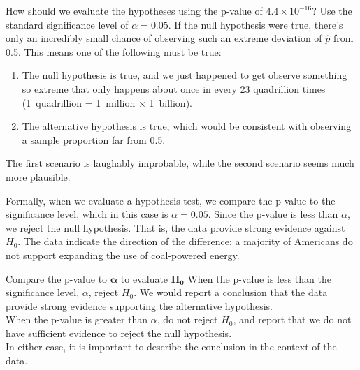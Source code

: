 \begin{examplewrap}
\begin{nexample}{How should we evaluate the hypotheses using the
    p-value of $4.4 \times 10^{-16}$?
    Use the standard significance level of $\alpha = 0.05$.}
  If the null hypothesis were true, there's only an incredibly
  small chance of observing such an extreme deviation of
  $\hat{p}$ from 0.5.
  This means one of the following must be true:
  \begin{enumerate}
    \item The null hypothesis is true, and we just happened
        to get observe something so extreme that only happens
        about once in every 23 quadrillion times
        (1~quadrillion = 1~million $\times$ 1~billion).
    \item The alternative hypothesis is true,
        which would be consistent
        with observing a sample proportion far from 0.5.
  \end{enumerate}
  The first scenario is laughably improbable,
  while the second scenario seems much more plausible.

  Formally, when we evaluate a hypothesis test,
  we compare the p-value to the significance level,
  which in this case is $\alpha = 0.05$.
  Since the p-value is less than $\alpha$,
  we reject the null hypothesis.
  That is, the data provide strong evidence against $H_0$.
  The data indicate the direction of the difference:
  a majority of Americans do not support
  expanding the use of coal-powered energy.
\end{nexample}
\end{examplewrap}


\begin{onebox}{Compare the p-value to $\mathbf{\alpha}$ to
      evaluate $\mathbf{H_0}$}
  When the p-value is less than the significance level, $\alpha$,
  reject $H_0$. We would report a conclusion that the data provide
  strong evidence supporting the alternative hypothesis. \\[2mm]
  When the p-value is greater than $\alpha$, do not reject $H_0$,
  and report that we do not have sufficient evidence to reject the
  null hypothesis. \\[2mm]
  In either case, it is important to describe the conclusion
  in the context of the data.
\end{onebox}







